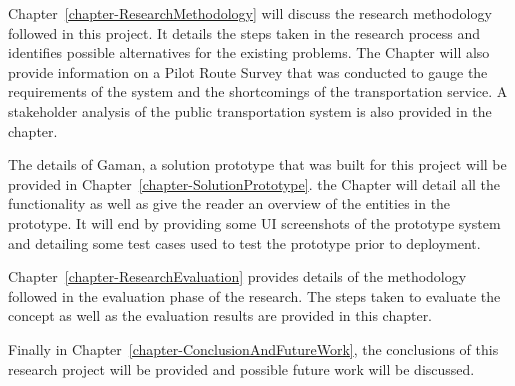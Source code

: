 Chapter~\ref{chapter-ResearchMethodology} will discuss the research methodology followed in this project. It details the steps taken in the research process and identifies possible alternatives for the existing problems. The Chapter will also provide information on a Pilot Route Survey that was conducted to gauge the requirements of the system and the shortcomings of the transportation service. A stakeholder analysis of the public transportation system is also provided in the chapter.

The details of Gaman, a solution prototype that was built for this project will be provided in Chapter~\ref{chapter-SolutionPrototype}. the Chapter will detail all the functionality as well as give the reader an overview of the entities in the prototype. It will end by providing some UI screenshots of the prototype system and detailing some test cases used to test the prototype prior to deployment.

Chapter~\ref{chapter-ResearchEvaluation} provides details of the methodology followed in the evaluation phase of the research. The steps taken to evaluate the concept as well as the evaluation results are provided in this chapter.

Finally in Chapter~\ref{chapter-ConclusionAndFutureWork}, the conclusions of this research project will be provided and possible future work will be discussed.


